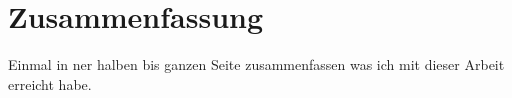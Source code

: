 \chapter{Zusammenfassung}
Einmal in ner halben bis ganzen Seite zusammenfassen was ich mit dieser Arbeit erreicht habe.